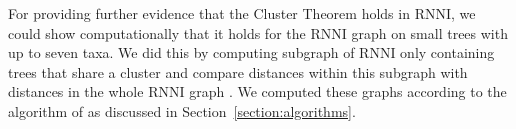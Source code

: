 \documentclass{amsart}
\newcommand{\rnni}{\mathrm{RNNI}}
\begin{document}
For providing further evidence that the Cluster Theorem holds in $\rnni$, we could show computationally that it holds for the $\rnni$ graph on small trees with up to seven taxa.
We did this by computing subgraph of $\rnni$ only containing trees that share a cluster and compare distances within this subgraph with distances in the whole $\rnni$ graph \autocite{Collienne2019}.
We computed these graphs according to the algorithm of \autocite{Gavryushkin2018-ol} as discussed in Section~\ref{section:algorithms}.

\end{document}
